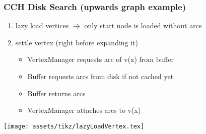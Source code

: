 \begin{frame}
    \frametitle{CCH Disk Search (upwards graph example)}

    \begin{enumerate}
        \item lazy load vertices $\Rrightarrow$ only start node is loaded without arcs 
        \item<2-> settle vertex (right before expanding it) 
        \begin{itemize}
            \item<3-> VertexManager requests arc of v(x) from buffer
            \item<4-> Buffer requests arcs from disk if not cached yet
            \item<6-> Buffer returns arcs
            \item<7-> VertexManager attaches arcs to v(x)
        \end{itemize}
    \end{enumerate}
    \vfill
    \texttt{[image: assets/tikz/lazyLoadVertex.tex]}
    

\end{frame}